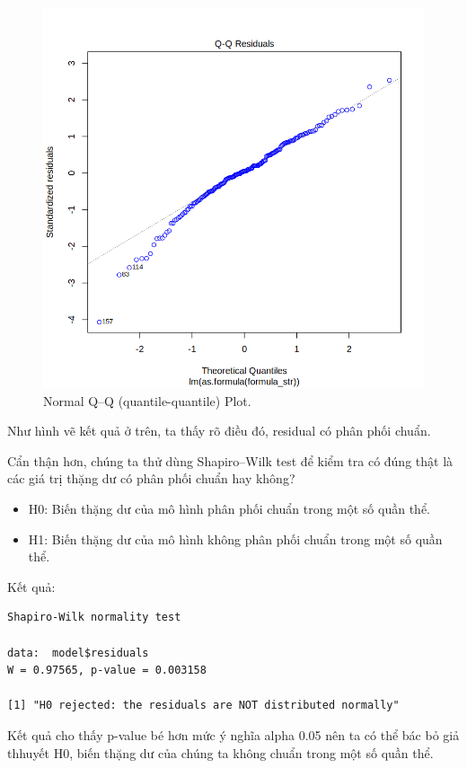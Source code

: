\begin{figure}[H]
    \centering
    \includegraphics[width=0.75\columnwidth]{csm_figures/best_csm_model_qq.png}
    \caption{Normal Q–Q (quantile-quantile) Plot.}
    \label{fig:best_csm_model_qq}
\end{figure}

Như hình vẽ kết quả ở trên, ta thấy rõ điều đó, residual có phân phối chuẩn.

Cẩn thận hơn, chúng ta thử dùng Shapiro–Wilk test để kiểm tra có đúng thật là các giá trị thặng dư có phân phối chuẩn hay không?
\begin{itemize}
    \item H0: Biến thặng dư của mô hình phân phối chuẩn trong một số quần thể.
    \item H1: Biến thặng dư của mô hình không phân phối chuẩn trong một số quần thể.
\end{itemize}

Kết quả:
\begin{lstlisting}
Shapiro-Wilk normality test

data:  model$residuals
W = 0.97565, p-value = 0.003158

[1] "H0 rejected: the residuals are NOT distributed normally"
\end{lstlisting}

Kết quả cho thấy p-value bé hơn mức ý nghĩa alpha 0.05 nên ta có thể bác bỏ giả thhuyết H0, biến thặng dư của chúng ta không chuẩn trong một số quần thể.  


